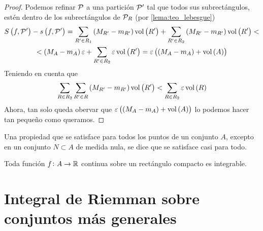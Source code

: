 \begin{proof}
    Podemos refinar $\mathcal{P}$ a una partición $\mathcal{P}^\prime$ tal que todos sus
    subrectángulos, est\'en dentro de los subrectángulos de $\mathcal{P}_R$ (por \ref{lema:teo_lebesgue})
    \begin{gather*}
        S\left( f, \mathcal{P}^\prime \right) - s\left( f, \mathcal{P}^\prime \right) =
        \sum_{R^\prime \in R_1} \left( M_{R^\prime} - m_{R^\prime} \right)
        \operatorname{vol} \left( R^\prime \right) + \sum_{R^\prime \in R_2}
        \left( M_{R^\prime} - m_{R^\prime}\right) \operatorname{vol}\left( R^\prime \right)
        < \\ < \left( M_A - m_A \right)\varepsilon + \sum_{R^\prime \in R_2}
        \varepsilon \operatorname{vol}\left( R^\prime \right) = \varepsilon \left(
        \left( M_A - m_A \right) + \operatorname{vol} \left( A \right)\right)
    \end{gather*}
    Teniendo en cuenta que
    \[
        \sum_{R \in R_2} \sum_{R^\prime \in R} \left( M_{R^\prime} -
        m_{R^\prime}\right) \operatorname{vol}\left( R^\prime \right) < \sum_{R \in R_2}
        \varepsilon \operatorname{vol}\left( R \right)
    \]
    Ahora, tan solo queda obervar que $\varepsilon \left( \left( M_A - m_A \right)
    + \operatorname{vol} \left( A \right)\right)$ lo podemos hacer tan pequeño como queramos.
\end{proof}

\begin{defi}
    Una propiedad que se satisface para todos los puntos de un conjunto $A$,
    excepto en un conjunto $N \subset A$ de medida nula, se dice que se satisface
    casi para todo.
\end{defi}

\begin{prop}
    Toda función $f \colon A \to \mathbb{R}$ continua sobre un rectángulo compacto es
    integrable.
\end{prop}

\section{Integral de Riemman sobre conjuntos más generales}

